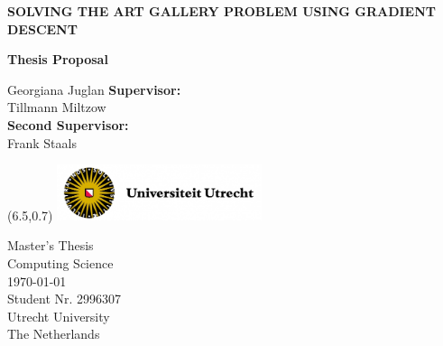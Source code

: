 \documentclass{article}
\begin{document}
\nocite{*} %

\thispagestyle{empty} 
\begin{center}
    \vspace*{0.5cm}
    \huge
    \textbf{SOLVING THE ART GALLERY PROBLEM USING GRADIENT DESCENT}

    \vspace*{0.4cm}
    \textbf{Thesis Proposal }
    \vspace*{2cm}




    \vspace{-1cm}
    \LARGE
    Georgiana Juglan
    \vfill 
    \large    
    \textbf{Supervisor:} \\
    Tillmann Miltzow \\
    \textbf{Second Supervisor:} \\
    Frank Staals \\
     
\end{center}
   

\begin{textblock}{3}(6.5,0.7)
\includegraphics[width = 6cm]{Figures/UU logo.png}
\end{textblock}

\begin{flushleft}
    \vspace{0.5cm}
    Master's Thesis \\
    Computing Science\\
    \today\\
    Student Nr. 2996307 \\
    Utrecht University\\
    The Netherlands
\end{flushleft}

\newpage
\thispagestyle{empty}

\thispagestyle{empty}
\tableofcontents
\thispagestyle{empty}


% 
% 
% 
% 

\renewcommand{\headrulewidth}{0pt}%
\fancyhead{}%




%
\end{document}
